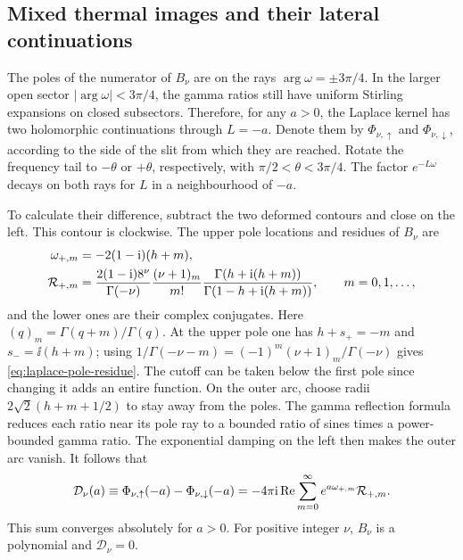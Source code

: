 \subsection{Mixed thermal images and their lateral continuations}
\label{sec:mixed-time}

The poles of the numerator of \(B_\nu\) are on the rays
\(\arg\omega=\pm3\pi/4\). In the larger open sector
\(|\arg\omega|<3\pi/4\), the gamma ratios still have uniform
Stirling expansions on closed subsectors. Therefore, for any
\(a>0\), the Laplace kernel has two holomorphic continuations
through \(L=-a\). Denote them by \(\Phi_{\nu,\uparrow}\) and
\(\Phi_{\nu,\downarrow}\), according to the side of the slit
from which they are reached. Rotate the frequency tail to
\(-\theta\) or \(+\theta\), respectively, with
\(\pi/2<\theta<3\pi/4\). The factor \(e^{-L\omega}\) decays on
both rays for \(L\) in a neighbourhood of \(-a\).

To calculate their difference, subtract the two deformed contours
and close on the left. This contour is clockwise. The upper pole
locations and residues of \(B_\nu\) are
\begin{align}
 \omega_{+,m} &=-2(1-\mathrm{i})(h+m),\notag\\
 \mathcal R_{+,m}
 &=\frac{2(1-\mathrm{i})8^\nu}{\Gamma(-\nu)}
   \frac{(\nu+1)_m}{m!}
   \frac{\Gamma(h+\mathrm{i}(h+m))}{\Gamma(1-h+\mathrm{i}(h+m))},
 \qquad m=0,1,\ldots ,
 \label{eq:laplace-pole-residue}
\end{align}
and the lower ones are their complex conjugates. Here
\((q)_m=\Gamma(q+m)/\Gamma(q)\). At the upper pole one has
\(h+s_+=-m\) and \(s_-=\ii(h+m)\); using
\(1/\Gamma(-\nu-m)=(-1)^m(\nu+1)_m/\Gamma(-\nu)\) gives
\eqref{eq:laplace-pole-residue}. The cutoff can be taken below the
first pole since changing it adds an entire function. On the outer arc,
choose radii \(2\sqrt{2}(h+m+1/2)\) to stay away from the poles.
The gamma reflection formula reduces each ratio near its pole ray
to a bounded ratio of sines times a power-bounded gamma ratio.
The exponential damping on the left then makes the outer arc vanish.
It follows that
\begin{equation}
 \mathcal D_\nu(a)
 \equiv \Phi_{\nu,\uparrow}(-a)-\Phi_{\nu,\downarrow}(-a)
 =-4\pi\mathrm{i}\,{\rm Re}\sum_{m=0}^\infty
    e^{a\omega_{+,m}}\mathcal R_{+,m}.
 \label{eq:laplace-jump}
\end{equation}
This sum converges absolutely for \(a>0\). For positive integer
\(\nu\), \(B_\nu\) is a polynomial and \(\mathcal D_\nu=0\).

